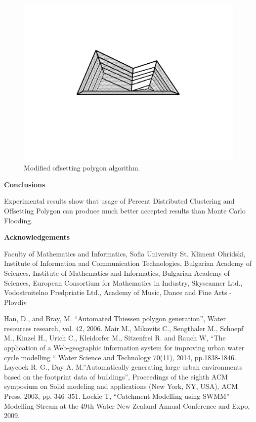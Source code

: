\documentclass[11pt,leqno]{book}
\def\bibname{{\Large\bf References}}
\newcommand{\sect}[1]{\vskip7mm\par{\large \bf #1}}
\begin{document}
\begin{figure}[h!]
  \centering
  \includegraphics[width=.9\linewidth]{pic14.png}
  \caption{Modified offsetting polygon algorithm.}
\end{figure}
\FloatBarrier

\sect{Conclusions}

Experimental results show that usage of Percent Distributed Clustering and Offsetting Polygon can produce much better accepted results than Monte Carlo Flooding.

\sect{Acknowledgements}

Faculty of Mathematics and Informatics, Sofia University St. Kliment Ohridski, Institute of Information and Communication Technologies, Bulgarian Academy of Sciences, Institute of Mathematics and Informatics, Bulgarian Academy of Sciences, European Consortium for Mathematics in Industry, Skyscanner Ltd., Vodostroitelno Predpriatie Ltd., Academy of Music, Dance and Fine Arts - Plovdiv

\def\bibname{{\Large\bf References}}
\begin{thebibliography}{99}
%
 Han, D., and Bray, M. “Automated Thiessen polygon generation”, Water resources research, vol. 42, 2006.
%
 Mair M., Mikovits C., Sengthaler M., Schoepf M., Kinzel H., Urich C., Kleidorfer M., Sitzenfrei R. and Rauch W, “The application of a Web-geographic information system for improving urban water cycle modelling “  Water Science and Technology 70(11), 2014, pp.1838-1846.
%
 Laycock R. G., Day A. M.”Automatically generating large urban environments based on the footprint data of buildings”, Proceedings of the eighth ACM symposium on Solid modeling and applications (New York, NY, USA), ACM Press, 2003, pp. 346–351.
%
 Lockie T, “Catchment Modelling using SWMM” Modelling Stream at the 49th Water New Zealand Annual Conference and Expo, 2009.
%
\end{thebibliography}
%
\end{document}
